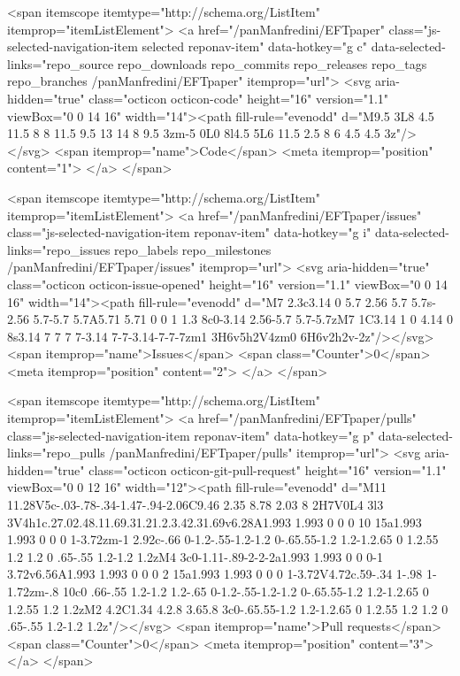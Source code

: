   <span itemscope itemtype="http://schema.org/ListItem" itemprop="itemListElement">
    <a href="/panManfredini/EFTpaper" class="js-selected-navigation-item selected reponav-item" data-hotkey="g c" data-selected-links="repo_source repo_downloads repo_commits repo_releases repo_tags repo_branches /panManfredini/EFTpaper" itemprop="url">
      <svg aria-hidden="true" class="octicon octicon-code" height="16" version="1.1" viewBox="0 0 14 16" width="14"><path fill-rule="evenodd" d="M9.5 3L8 4.5 11.5 8 8 11.5 9.5 13 14 8 9.5 3zm-5 0L0 8l4.5 5L6 11.5 2.5 8 6 4.5 4.5 3z"/></svg>
      <span itemprop="name">Code</span>
      <meta itemprop="position" content="1">
</a>  </span>

    <span itemscope itemtype="http://schema.org/ListItem" itemprop="itemListElement">
      <a href="/panManfredini/EFTpaper/issues" class="js-selected-navigation-item reponav-item" data-hotkey="g i" data-selected-links="repo_issues repo_labels repo_milestones /panManfredini/EFTpaper/issues" itemprop="url">
        <svg aria-hidden="true" class="octicon octicon-issue-opened" height="16" version="1.1" viewBox="0 0 14 16" width="14"><path fill-rule="evenodd" d="M7 2.3c3.14 0 5.7 2.56 5.7 5.7s-2.56 5.7-5.7 5.7A5.71 5.71 0 0 1 1.3 8c0-3.14 2.56-5.7 5.7-5.7zM7 1C3.14 1 0 4.14 0 8s3.14 7 7 7 7-3.14 7-7-3.14-7-7-7zm1 3H6v5h2V4zm0 6H6v2h2v-2z"/></svg>
        <span itemprop="name">Issues</span>
        <span class="Counter">0</span>
        <meta itemprop="position" content="2">
</a>    </span>

  <span itemscope itemtype="http://schema.org/ListItem" itemprop="itemListElement">
    <a href="/panManfredini/EFTpaper/pulls" class="js-selected-navigation-item reponav-item" data-hotkey="g p" data-selected-links="repo_pulls /panManfredini/EFTpaper/pulls" itemprop="url">
      <svg aria-hidden="true" class="octicon octicon-git-pull-request" height="16" version="1.1" viewBox="0 0 12 16" width="12"><path fill-rule="evenodd" d="M11 11.28V5c-.03-.78-.34-1.47-.94-2.06C9.46 2.35 8.78 2.03 8 2H7V0L4 3l3 3V4h1c.27.02.48.11.69.31.21.2.3.42.31.69v6.28A1.993 1.993 0 0 0 10 15a1.993 1.993 0 0 0 1-3.72zm-1 2.92c-.66 0-1.2-.55-1.2-1.2 0-.65.55-1.2 1.2-1.2.65 0 1.2.55 1.2 1.2 0 .65-.55 1.2-1.2 1.2zM4 3c0-1.11-.89-2-2-2a1.993 1.993 0 0 0-1 3.72v6.56A1.993 1.993 0 0 0 2 15a1.993 1.993 0 0 0 1-3.72V4.72c.59-.34 1-.98 1-1.72zm-.8 10c0 .66-.55 1.2-1.2 1.2-.65 0-1.2-.55-1.2-1.2 0-.65.55-1.2 1.2-1.2.65 0 1.2.55 1.2 1.2zM2 4.2C1.34 4.2.8 3.65.8 3c0-.65.55-1.2 1.2-1.2.65 0 1.2.55 1.2 1.2 0 .65-.55 1.2-1.2 1.2z"/></svg>
      <span itemprop="name">Pull requests</span>
      <span class="Counter">0</span>
      <meta itemprop="position" content="3">
</a>  </span>

